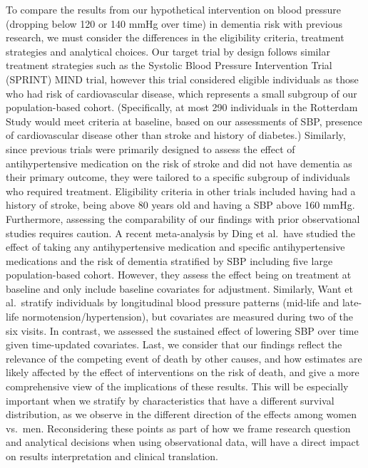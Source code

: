 \documentclass[
]{book}
\begin{document}
To compare the results from our hypothetical intervention on blood pressure (dropping below 120 or 140 mmHg over time) in dementia risk with previous research, we must consider the differences in the eligibility criteria, treatment strategies and analytical choices. Our target trial by design follows similar treatment strategies such as the Systolic Blood Pressure Intervention Trial (SPRINT) MIND trial, however this trial considered eligible individuals as those who had risk of cardiovascular disease\autocite{williamson2019}, which represents a small subgroup of our population-based cohort. (Specifically, at most 290 individuals in the Rotterdam Study would meet criteria at baseline, based on our assessments of SBP, presence of cardiovascular disease other than stroke and history of diabetes.) Similarly, since previous trials were primarily designed to assess the effect of antihypertensive medication on the risk of stroke and did not have dementia as their primary outcome, they were tailored to a specific subgroup of individuals who required treatment. Eligibility criteria in other trials included having had a history of stroke, being above 80 years old and having a SBP above 160 mmHg\autocite{ace_inhibitors2000,prince1996,forette2002,progress2003,lithell2003,diener2008,anderson2011,williamson2019,bosch2019}. Furthermore, assessing the comparability of our findings with prior observational studies requires caution. A recent meta-analysis by Ding et al.~have studied the effect of taking any antihypertensive medication and specific antihypertensive medications and the risk of dementia stratified by SBP including five large population-based cohort\autocite{ding2020}. However, they assess the effect being on treatment at baseline and only include baseline covariates for adjustment. Similarly, Want et al.~stratify individuals by longitudinal blood pressure patterns (mid-life and late-life normotension/hypertension), but covariates are measured during two of the six visits\autocite{walker2019}. In contrast, we assessed the sustained effect of lowering SBP over time given time-updated covariates. Last, we consider that our findings reflect the relevance of the competing event of death by other causes, and how estimates are likely affected by the effect of interventions on the risk of death, and give a more comprehensive view of the implications of these results. This will be especially important when we stratify by characteristics that have a different survival distribution, as we observe in the different direction of the effects among women vs.~men\autocite{beam2018}. Reconsidering these points as part of how we frame research question and analytical decisions when using observational data, will have a direct impact on results interpretation and clinical translation.
\end{document}
